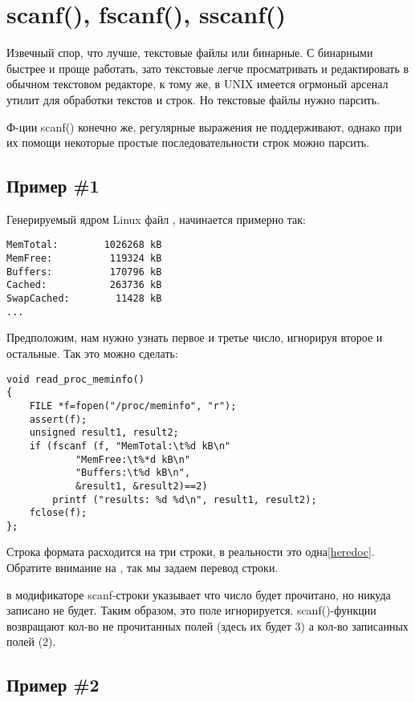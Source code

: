 ﻿\section{scanf(), fscanf(), sscanf()}

Извечный спор, что лучше, текстовые файлы или бинарные. С бинарными быстрее и проще работать, зато текстовые
легче просматривать и редактировать в обычном текстовом редакторе, к тому же, в UNIX имеется огрмоный арсенал
утилит для обработки текстов и строк. Но текстовые файлы нужно парсить.

Ф-ции scanf()\cite[7.19.6.2]{C99TC3} конечно же, регулярные выражения не поддерживают, 
однако при их помощи некоторые простые последовательности строк можно парсить. 

\subsection{Пример \#1}

Генерируемый ядром Linux файл , начинается примерно так:

\begin{lstlisting}
MemTotal:        1026268 kB
MemFree:          119324 kB
Buffers:          170796 kB
Cached:           263736 kB
SwapCached:        11428 kB
...
\end{lstlisting}

Предположим, нам нужно узнать первое и третье число, игнорируя второе и остальные.
Так это можно сделать:

\begin{lstlisting}
void read_proc_meminfo()
{
	FILE *f=fopen("/proc/meminfo", "r");
	assert(f);
	unsigned result1, result2;
	if (fscanf (f, "MemTotal:\t%d kB\n"
			"MemFree:\t%*d kB\n"
			"Buffers:\t%d kB\n", 
			&result1, &result2)==2)
		printf ("results: %d %d\n", result1, result2);
	fclose(f);
};
\end{lstlisting}

Строка формата расходится на три строки, в реальности это одна\ref{heredoc}.
Обратите внимание на , так мы задаем перевод строки.

\TT{*} в модификаторе scanf-строки указывает что число будет прочитано, но никуда записано не будет.
Таким образом, это поле игнорируется. scanf()-функции возвращают кол-во не прочитанных полей (здесь
их будет 3) а кол-во записанных полей (2).

\subsection{Пример \#2}

